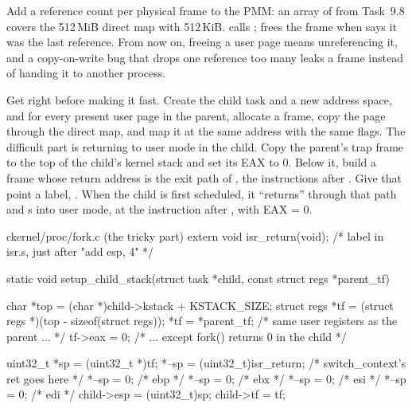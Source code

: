 \documentclass[11pt,a4paper]{article}
\begin{document}
Add a reference count per physical frame to the PMM: an array of  from Task~9.8 covers the
512\,MiB direct map with 512\,KiB.  calls ;  frees the frame
when  says it was the last reference. From now on, freeing a user page means unreferencing
it, and a copy-on-write bug that drops one reference too many leaks a frame instead of handing it to another process.

Get  right before making it fast. Create the child task and a new address space, and for every present
user page in the parent, allocate a frame, copy the page through the direct map, and map it at the same address with
the same flags. The difficult part is returning to user mode in the child. Copy the parent's trap frame to the top of
the child's kernel stack and set its EAX to 0. Below it, build a  frame whose return address is
the exit path of , the instructions after . Give that point a label,
. When the child is first scheduled, it ``returns'' through that path and s into user mode,
at the instruction after , with EAX = 0.

\begin{lst}{c}{kernel/proc/fork.c (the tricky part)}
extern void isr_return(void);               /* label in isr.s, just after "add esp, 4" */

static void setup_child_stack(struct task *child, const struct regs *parent_tf)
{
    char *top = (char *)child->kstack + KSTACK_SIZE;
    struct regs *tf = (struct regs *)(top - sizeof(struct regs));
    *tf = *parent_tf;                        /* same user registers as the parent ...  */
    tf->eax = 0;                             /* ... except fork() returns 0 in the child */

    uint32_t *sp = (uint32_t *)tf;
    *--sp = (uint32_t)isr_return;            /* switch_context's ret goes here */
    *--sp = 0;                               /* ebp */
    *--sp = 0;                               /* ebx */
    *--sp = 0;                               /* esi */
    *--sp = 0;                               /* edi */
    child->esp = (uint32_t)sp;
    child->tf  = tf;
}
\end{lst}
\end{document}
